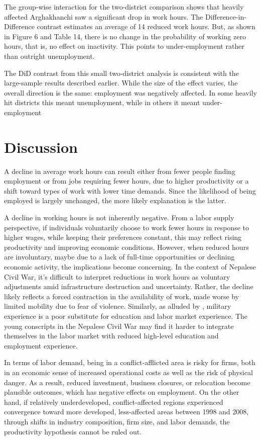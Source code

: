 \documentclass[12pt,a4paper]{article}
\begin{document}
The group-wise interaction for the two-district comparison shows that heavily affected Arghakhanchi saw a significant drop in work hours. The Difference-in-Difference contrast estimates an average of 14 reduced work hours. But, as shown in Figure 6 and Table 14, there is no change in the probability of working zero hours, that is, no effect on inactivity. This points to under-employment rather than outright unemployment.

The DiD contrast from this small two-district analysis is consistent with the large-sample results described earlier. While the size of the effect varies, the overall direction is the same: employment was negatively affected. In some heavily hit districts this meant unemployment, while in others it meant under-employment

\section{Discussion}
A decline in average work hours can result either from fewer people finding employment or from jobs requiring fewer hours, due to higher productivity or a shift toward types of work with lower time demands. Since the likelihood of being employed is largely unchanged, the more likely explanation is the latter.

A decline in working hours is not inherently negative. From a labor supply perspective, if individuals voluntarily choose to work fewer hours in response to higher wages, while keeping their preferences constant, this may reflect rising productivity and improving economic conditions. However, when reduced hours are involuntary, maybe due to a lack of full-time opportunities or declining economic activity, the implications become concerning. In the context of Nepalese Civil War, it's difficult to interpret reductions in work hours as voluntary adjustments amid infrastructure destruction and uncertainty. Rather, the decline likely reflects a forced contraction in the availability of work, made worse by limited mobility due to fear of violence. Similarly, as alluded by \textcite{blattman2010civil}, military experience is a poor substitute for education and labor market experience. The young conscripts in the Nepalese Civil War may find it harder to integrate themselves in the labor market with reduced high-level education and employment experience.

In terms of labor demand, being in a conflict-afflicted area is risky for firms, both in an economic sense of increased operational costs as well as the risk of physical danger. As a result, reduced investment, business closures, or relocation become plausible outcomes, which has negative effects on employment. On the other hand, if relatively underdeveloped, conflict-affected regions experienced convergence toward more developed, less-affected areas between 1998 and 2008, through shifts in industry composition, firm size, and labor demands, the productivity hypothesis cannot be ruled out.

\printbibliography
	
\end{document}
